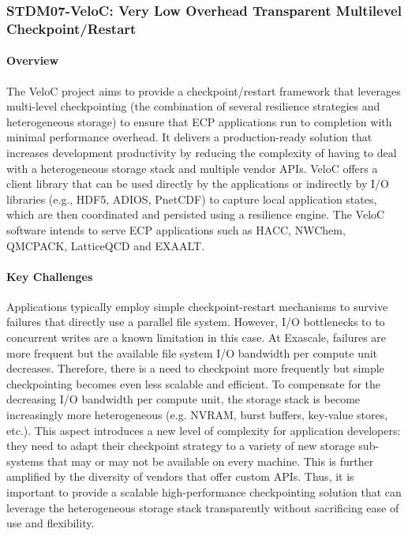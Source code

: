 \subsubsection{ STDM07-VeloC: Very Low Overhead Transparent Multilevel Checkpoint/Restart} 


\paragraph{Overview} 

The VeloC project aims to provide a checkpoint/restart framework that
leverages multi-level checkpointing (the combination of several
resilience strategies and heterogeneous storage) to ensure that ECP
applications run to completion with minimal performance overhead. It
delivers a production-ready solution that increases development
productivity by reducing the complexity of having to deal with a
heterogeneous storage stack and multiple vendor APIs. VeloC offers a
client library that can be used directly by the applications or
indirectly by I/O libraries (e.g., HDF5, ADIOS, PnetCDF) to capture
local application states, which are then coordinated and persisted
using a resilience engine. The VeloC software intends to serve ECP
applications such as HACC, NWChem, QMCPACK, LatticeQCD and EXAALT.

\paragraph{Key Challenges}

Applications typically employ simple checkpoint-restart mechanisms to
survive failures that directly use a parallel file system.  However,
I/O bottlenecks to to concurrent writes are a known limitation in this
case. At Exascale, failures are more frequent but the available file
system I/O bandwidth per compute unit decreases. Therefore, there is a
need to checkpoint more frequently but simple checkpointing becomes
even less scalable and efficient. To compensate for the decreasing I/O
bandwidth per compute unit, the storage stack is become increasingly
more heterogeneous (e.g. NVRAM, burst buffers, key-value stores,
etc.). This aspect introduces a new level of complexity for
application developers: they need to adapt their checkpoint strategy
to a variety of new storage sub-systems that may or may not be
available on every machine. This is further amplified by the diversity
of vendors that offer custom APIs. Thus, it is important to provide
a scalable high-performance checkpointing solution that can leverage
the heterogeneous storage stack transparently without sacrificing
ease of use and flexibility.

